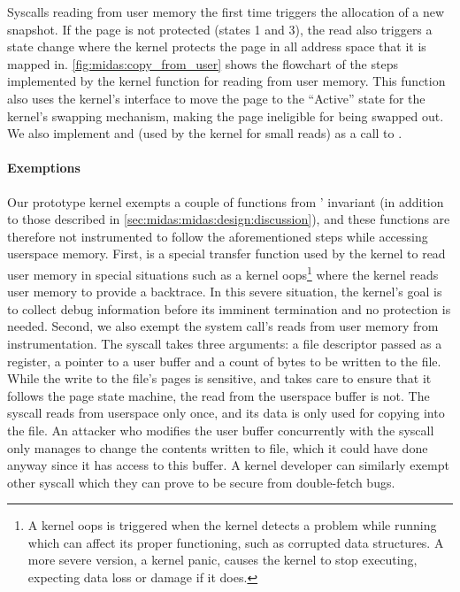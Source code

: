 Syscalls reading from user memory the first time triggers the
allocation of a new snapshot.
If the page is not protected (states 1 and 3), the read also
triggers a state change where the kernel protects the page
in all address space that it is mapped in.
\autoref{fig:midas:copy_from_user} shows the flowchart of the steps
implemented by the kernel function  for
reading from user memory.
This function also uses the kernel's 
interface to move the page to the ``Active'' state for the
kernel's swapping mechanism, making the page ineligible for being
swapped out.
We also implement  and 
(used by the kernel for small reads) as a call to .

\paragraph{Exemptions}
Our prototype \midas kernel exempts a couple of functions
from \midas' invariant (in addition to those described in
\autoref{sec:midas:midas:design:discussion}), and these functions are
therefore not instrumented
to follow the aforementioned steps while accessing userspace
memory.
First,  is a special
transfer function used by the kernel to
read user memory in special situations such as a kernel
oops\footnote{A kernel oops is triggered when the kernel detects a
problem while running which can affect its proper functioning, such
as corrupted data structures.
A more severe version, a kernel panic, causes the kernel to stop
executing, expecting data loss or damage if it does.}
where the kernel reads user memory to provide a backtrace.
In this severe situation, the kernel's goal is to collect debug
information before its imminent termination and no \tocttou protection
is needed.
Second, we also exempt the  system
call's reads from user memory from instrumentation.
The  syscall takes three arguments: a
file descriptor passed as a register, a pointer to a user
buffer and a count of bytes to be written to the file.
While the write to the file's pages is sensitive, and
\midas takes care to ensure that it follows the page state
machine, the read from the userspace buffer is not.
The syscall reads from userspace only once, and its data
is only used for copying into the file.
An attacker who modifies the user buffer concurrently with
the syscall only manages to change the contents written to
file, which it could have done anyway since it has access to
this buffer.
A kernel developer can similarly exempt other syscall which
they can prove to be secure from double-fetch bugs.


